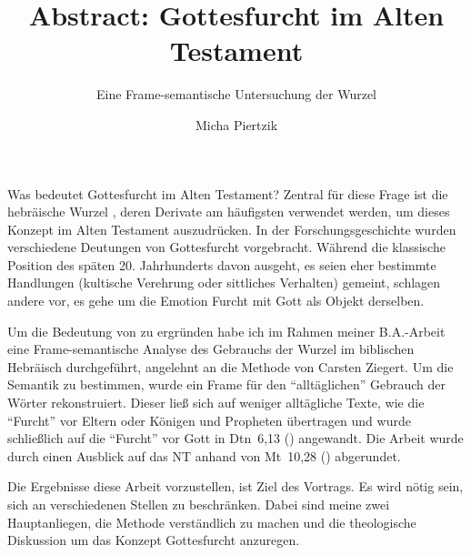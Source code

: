 \documentclass{scrartcl}
\author{Micha Piertzik}
\title{Abstract: Gottesfurcht im Alten Testament}
\subtitle{Eine Frame-semantische Untersuchung der Wurzel \heb{ירא}}
\begin{document}
\maketitle


Was bedeutet Gottesfurcht im Alten Testament? Zentral für diese Frage ist die hebräische Wurzel , deren Derivate am häufigsten verwendet werden, um dieses Konzept im Alten Testament auszudrücken. In der Forschungsgeschichte wurden verschiedene Deutungen von Gottesfurcht vorgebracht. Während die klassische Position des späten 20. Jahrhunderts davon ausgeht, es seien eher bestimmte Handlungen (kultische Verehrung oder sittliches Verhalten) gemeint, schlagen andere vor, es gehe um die Emotion Furcht mit Gott als Objekt derselben.

Um die Bedeutung von  zu ergründen habe ich im Rahmen meiner B.A.-Arbeit eine Frame-semantische Analyse des Gebrauchs der Wurzel im biblischen Hebräisch durchgeführt, angelehnt an die Methode von Carsten Ziegert.
Um die Semantik zu bestimmen, wurde ein Frame für den \enquote{alltäglichen} Gebrauch der Wörter rekonstruiert.
Dieser ließ sich auf weniger alltägliche Texte, wie die \enquote{Furcht} vor Eltern oder Königen und Propheten übertragen und wurde schließlich auf die \enquote{Furcht} vor Gott in Dtn~6,13 () angewandt.
Die Arbeit wurde durch einen Ausblick auf das NT anhand von Mt~10,28 () abgerundet.

Die Ergebnisse diese Arbeit vorzustellen, ist Ziel des Vortrags.
Es wird nötig sein, sich an verschiedenen Stellen zu beschränken.
Dabei sind meine zwei Hauptanliegen, die Methode verständlich zu machen und die theologische Diskussion um das Konzept Gottesfurcht anzuregen.

\nocite{Becker1965}
\nocite{Fuhs1982}
\nocite{Kipfer2016}

\printbibliography
\end{document}

